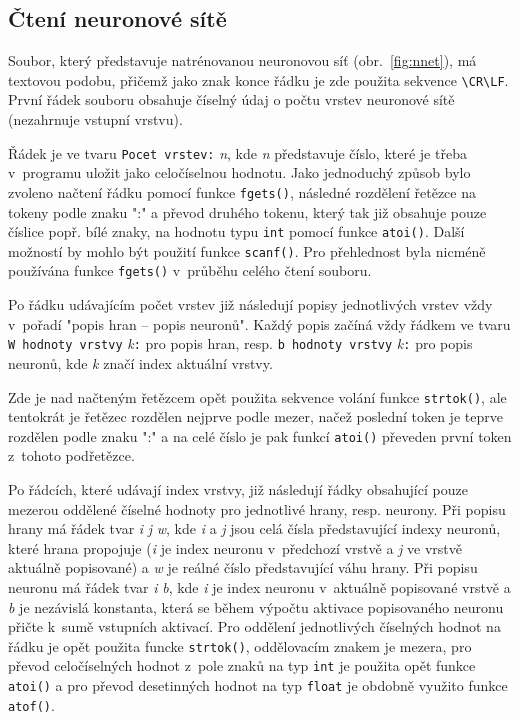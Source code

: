 \documentclass[12pt, a4paper, titlepage]{report}
\begin{document}
\subsection{Čtení neuronové sítě}
Soubor, který představuje natrénovanou neuronovou síť (obr.~\ref{fig:nnet}), má textovou podobu, přičemž jako znak konce řádku je zde použita sekvence \texttt{\textbackslash CR\textbackslash LF}. První řádek souboru obsahuje číselný údaj o počtu vrstev neuronové sítě (nezahrnuje vstupní vrstvu).\par
Řádek je ve tvaru \texttt{Pocet vrstev:} \textit{n}, kde \textit{n} představuje číslo, které je třeba v~programu uložit jako celočíselnou hodnotu. Jako jednoduchý způsob bylo zvoleno načtení řádku pomocí funkce \texttt{fgets()}, následné rozdělení řetězce na tokeny podle znaku ":" a převod druhého tokenu, který tak již obsahuje pouze číslice popř. bílé znaky, na hodnotu typu \texttt{int} pomocí funkce \texttt{atoi()}. Další možností by mohlo být použití funkce \texttt{scanf()}. Pro přehlednost byla nicméně používána funkce \texttt{fgets()} v~průběhu celého čtení souboru.\par
Po řádku udávajícím počet vrstev již následují popisy jednotlivých vrstev vždy v~pořadí "popis hran – popis neuronů". Každý popis začíná vždy řádkem ve tvaru \texttt{W hodnoty vrstvy} \textit{k}\texttt{:} pro popis hran, resp. \texttt{b hodnoty vrstvy} \textit{k}\texttt{:} pro popis neuronů, kde \textit{k} značí index aktuální vrstvy.\par
Zde je nad načteným řetězcem opět použita sekvence volání funkce \texttt{strtok()}, ale tentokrát je řetězec rozdělen nejprve podle mezer, načež poslední token je teprve rozdělen podle znaku ":" a na celé číslo je pak funkcí \texttt{atoi()} převeden první token z~tohoto podřetězce.\par
Po řádcích, které udávají index vrstvy, již následují řádky obsahující pouze mezerou oddělené číselné hodnoty pro jednotlivé hrany, resp. neurony. Při popisu hrany má řádek tvar \textit{i} \textit{j} \textit{w}, kde \textit{i} a \textit{j} jsou celá čísla představující indexy neuronů, které hrana propojuje (\textit{i} je index neuronu v~předchozí vrstvě a \textit{j} ve vrstvě aktuálně popisované) a \textit{w} je reálné číslo představující váhu hrany. Při popisu neuronu má řádek tvar \textit{i} \textit{b}, kde \textit{i} je index neuronu v~aktuálně popisované vrstvě a \textit{b} je nezávislá konstanta, která se během výpočtu aktivace popisovaného neuronu přičte k~sumě vstupních aktivací.
Pro oddělení jednotlivých číselných hodnot na řádku je opět použita funcke \texttt{strtok()}, oddělovacím znakem je mezera, pro převod celočíselných hodnot z~pole znaků na typ \texttt{int} je použita opět funkce \texttt{atoi()} a pro převod desetinných hodnot na typ \texttt{float} je obdobně využito funkce \texttt{atof()}.
\end{document}
